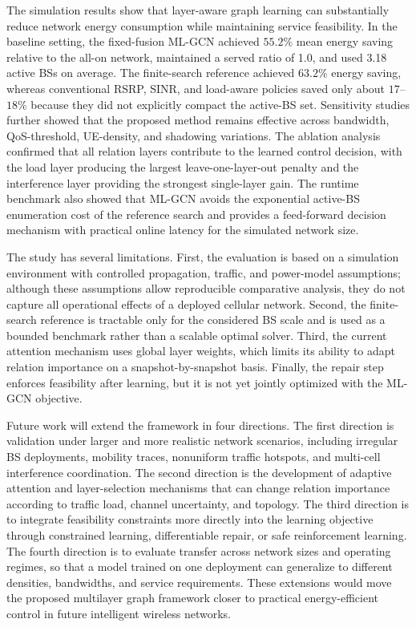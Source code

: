 \documentclass[journal]{IEEEtran}
\begin{document}
The simulation results show that layer-aware graph learning can substantially
reduce network energy consumption while maintaining service feasibility. In the
baseline setting, the fixed-fusion ML-GCN achieved $55.2\%$ mean energy saving
relative to the all-on network, maintained a served ratio of 1.0, and used
3.18 active BSs on average. The finite-search reference achieved $63.2\%$
energy saving, whereas conventional RSRP, SINR, and load-aware policies saved
only about $17$--$18\%$ because they did not explicitly compact the active-BS
set. Sensitivity studies further showed that the proposed method remains
effective across bandwidth, QoS-threshold, UE-density, and shadowing
variations. The ablation analysis confirmed that all relation layers contribute
to the learned control decision, with the load layer producing the largest
leave-one-layer-out penalty and the interference layer providing the strongest
single-layer gain. The runtime benchmark also showed that ML-GCN avoids the
exponential active-BS enumeration cost of the reference search and provides a
feed-forward decision mechanism with practical online latency for the simulated
network size.

The study has several limitations. First, the evaluation is based on a
simulation environment with controlled propagation, traffic, and power-model
assumptions; although these assumptions allow reproducible comparative
analysis, they do not capture all operational effects of a deployed cellular
network. Second, the finite-search reference is tractable only for the
considered BS scale and is used as a bounded benchmark rather than a scalable
optimal solver. Third, the current attention mechanism uses global layer
weights, which limits its ability to adapt relation importance on a
snapshot-by-snapshot basis. Finally, the repair step enforces feasibility after
learning, but it is not yet jointly optimized with the ML-GCN objective.

Future work will extend the framework in four directions. The first direction
is validation under larger and more realistic network scenarios, including
irregular BS deployments, mobility traces, nonuniform traffic hotspots, and
multi-cell interference coordination. The second direction is the development
of adaptive attention and layer-selection mechanisms that can change relation
importance according to traffic load, channel uncertainty, and topology. The
third direction is to integrate feasibility constraints more directly into the
learning objective through constrained learning, differentiable repair, or
safe reinforcement learning. The fourth direction is to evaluate transfer
across network sizes and operating regimes, so that a model trained on one
deployment can generalize to different densities, bandwidths, and service
requirements. These extensions would move the proposed multilayer graph
framework closer to practical energy-efficient control in future intelligent
wireless networks.
\end{document}
